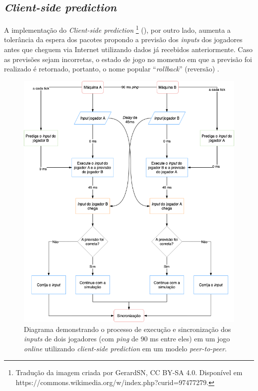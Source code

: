 \subsection{\textit{Client-side prediction}}

A implementação do \textit{Client-side prediction} \footnote{Tradução da imagem criada por GerardSN, CC BY-SA 4.0. Disponível em https://commons.wikimedia.org/w/index.php?curid=97477279.} (), por outro lado, aumenta a tolerância da espera dos pacotes propondo a previsão dos \textit{inputs} dos jogadores antes que cheguem via Internet utilizando dados já recebidos anteriormente. Caso as previsões sejam incorretas, o estado de jogo no momento em que a previsão foi realizado é retornado, portanto, o nome popular ``\textit{rollback}'' (reversão) \cite{rollback}.

\begin{figure}[htbp]
\centering
\includegraphics[width=1\textwidth]{images/rollback.png}
\caption{Diagrama demonstrando o processo de execução e sincronização dos \textit{inputs} de dois jogadores (com \textit{ping} de 90 ms entre eles) em um jogo \textit{online} utilizando \textit{client-side prediction} em um modelo \textit{peer-to-peer}.}
\label{fig:rollback_diagram}
\end{figure}

